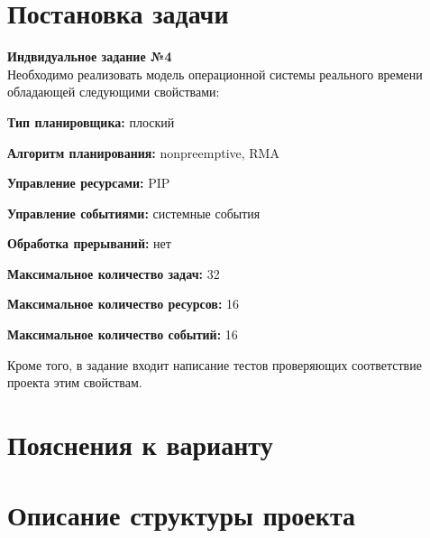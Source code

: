 \documentclass[12pt, a4paper]{article}
\begin{document}


\tableofcontents
\newpage

\section{Постановка задачи}

\textbf{Индвидуальное задание №4} \\
Необходимо реализовать модель операционной системы реального времени обладающей следующими свойствами:

\noindent
\textbf{Тип планировщика:} плоский

\noindent
\textbf{Алгоритм планирования:} nonpreemptive, RMA

\noindent
\textbf{Управление ресурсами:} PIP

\noindent
\textbf{Управление событиями:} системные события

\noindent
\textbf{Обработка прерываний:} нет

\noindent
\textbf{Максимальное количество задач:} 32

\noindent
\textbf{Максимальное количество ресурсов:} 16

\noindent
\textbf{Максимальное количество событий:} 16

\noindent
Кроме того, в задание входит написание тестов проверяющих соответствие проекта этим свойствам.
\newpage

\section{Пояснения к варианту}

\newpage

\section{Описание структуры проекта}

\end{document}
